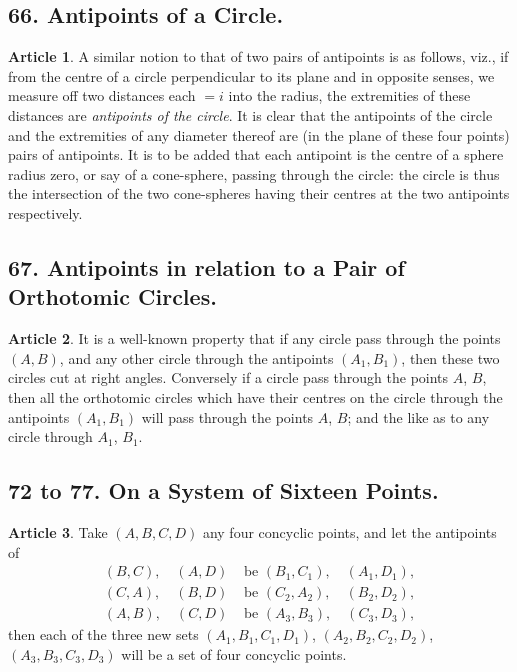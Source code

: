 \documentclass[11pt,a4paper]{article}
\theoremstyle{definition}
\newtheorem{art}{Article}
\begin{document}
\subsection*{66. Antipoints of a Circle.}

\begin{art}
A similar notion to that of two pairs of antipoints is as follows, viz., if from the centre of a circle perpendicular to its plane and in opposite senses, we measure off two distances each $= i$ into the radius, the extremities of these distances are \textit{antipoints of the circle}. It is clear that the antipoints of the circle and the extremities of any diameter thereof are (in the plane of these four points) pairs of antipoints. It is to be added that each antipoint is the centre of a sphere radius zero, or say of a cone-sphere, passing through the circle: the circle is thus the intersection of the two cone-spheres having their centres at the two antipoints respectively.
\end{art}

\subsection*{67. Antipoints in relation to a Pair of Orthotomic Circles.}

\begin{art}
It is a well-known property that if any circle pass through the points $(A, B)$, and any other circle through the antipoints $(A_{1}, B_{1})$, then these two circles cut at right angles. Conversely if a circle pass through the points $A$, $B$, then all the orthotomic circles which have their centres on the circle through the antipoints $(A_{1}, B_{1})$ will pass through the points $A$, $B$; and the like as to any circle through $A_{1}$, $B_{1}$.
\end{art}

\subsection*{72 to 77. On a System of Sixteen Points.}

\begin{art}
Take $(A, B, C, D)$ any four concyclic points, and let the antipoints of
\begin{align*}
(B, C), \quad (A, D) &\text{ be } (B_{1}, C_{1}), \quad (A_{1}, D_{1}), \\
(C, A), \quad (B, D) &\text{ be } (C_{2}, A_{2}), \quad (B_{2}, D_{2}), \\
(A, B), \quad (C, D) &\text{ be } (A_{3}, B_{3}), \quad (C_{3}, D_{3}),
\end{align*}
then each of the three new sets $(A_{1}, B_{1}, C_{1}, D_{1})$, $(A_{2}, B_{2}, C_{2}, D_{2})$, $(A_{3}, B_{3}, C_{3}, D_{3})$ will be a set of four concyclic points.
\end{art}
\end{document}
